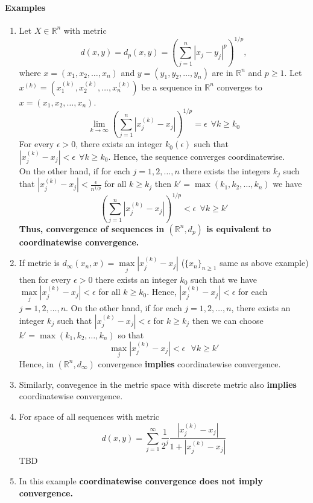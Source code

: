 \documentclass[12pt]{report}
\begin{document}
\paragraph*{Examples}
\begin{enumerate}
    \item Let $X \in \mathbb{R}^n$ with metric
    $$ d(x,y) = d_p(x,y) = \left(\sum_{j=1}^n|x_j - y_j|^p\right)^{1/p},$$
    where $x = (x_1, x_2, \dots,x_n)$ and $y = (y_1,  y_2, \dots,y_n)$ are in $\mathbb{R}^n$ and $p \geq 1$. Let $x^{(k)} = (x_1^{(k)},x_2^{(k)},\dots,x_n^{(k)})$ be a sequence in $\mathbb{R}^n$ converges to $x = (x_1,x_2,\dots,x_n)$. 
    $$ \lim_{k\to \infty}\left(\sum\limits_{j=1}^{n}|x_j^{(k)} - x_j|\right)^{1/p} = \epsilon~~\forall k \geq k_0$$
    For every $\epsilon > 0$, there exists an integer $k_0(\epsilon)$ such that $|x_j^{(k)} - x_j| < \epsilon~~\forall k \geq k_0$. Hence, the sequence converges coordinatewise.\\
    On the other hand, if for each $j = 1, 2, \dots, n$ there exists the integers $k_j$ such that $|x_j^{(k)} - x_j| < \frac{\epsilon}{n^{1/p}}$ for all $k \geq k_j$ then $k' = \max(k_1, k_2,\dots, k_n)$ we have
    $$ \left(\sum\limits_{j=1}^{n}|x_j^{(k)} - x_j|\right)^{1/p} < \epsilon~~\forall k \geq k'$$
    \textbf{Thus, convergence of sequences in $(\mathbb{R}^n,d_p)$ is equivalent to coordinatewise convergence.}
    \item If metric is $ d_{\infty}(x_n,x) = \max\limits_j|x_j^{(k)} - x_j|$ ($\{x_n\}_{n \geq 1}$ same as above example) then for every $\epsilon > 0$ there exists an integer $k_0$ such that we have $\max\limits_j|x_j^{(k)} - x_j| < \epsilon$ for all $k \geq k_0$. Hence, $|x_j^{(k)} - x_j| < \epsilon$ for each $j = 1,2, \dots,n$. On the other hand, if for each $ j = 1,2,\dots, n$, there exists an integer $k_j$ such that $|x_j^{(k)} - x_j| < \epsilon$ for $ k \geq k_j$ then we can choose $ k' = \max(k_1, k_2, \dots, k_n)$ so that
    $$ \max\limits_j|x_j^{(k)} - x_j| < \epsilon~~~\forall k \geq k'$$
    Hence, in $(\mathbb{R}^n,d_{\infty})$ convergence \textbf{implies} coordinatewise convergence.
    \item Similarly, convegence in the metric space with discrete metric also \textbf{implies} coordinatewise convergence.
    \item For space of all sequences with metric 
    $$ d(x,y) = \sum\limits_{j = 1}^{\infty} \frac{1}{2^j}\frac{|x_j^{(k)} - x_j|}{1 + |x_j^{(k)} - x_j|}$$
    TBD
    \item In this example \textbf{coordinatewise convergence does not imply convergence.}\\

\end{enumerate}
\end{document}

